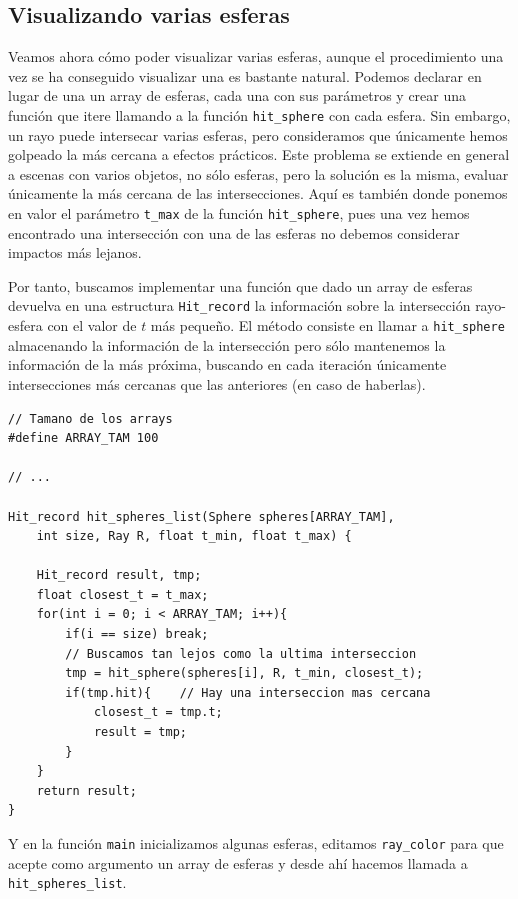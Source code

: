 \subsection{Visualizando varias esferas}

Veamos ahora cómo poder visualizar varias esferas, aunque el procedimiento una vez se ha conseguido visualizar una es bastante natural. Podemos declarar en lugar de una un array de esferas, cada una con sus parámetros y crear una función que itere llamando a la función \verb|hit_sphere| con cada esfera. Sin embargo, un rayo puede intersecar varias esferas, pero consideramos que únicamente hemos golpeado la más cercana a efectos prácticos. Este problema se extiende en general a escenas con varios objetos, no sólo esferas, pero la solución es la misma, evaluar únicamente la más cercana de las intersecciones. Aquí es también donde ponemos en valor el parámetro \verb|t_max| de la función \verb|hit_sphere|, pues una vez hemos encontrado una intersección con una de las esferas no debemos considerar impactos más lejanos.

Por tanto, buscamos implementar una función que dado un array de esferas devuelva en una estructura \verb|Hit_record| la información sobre la intersección rayo-esfera con el valor de $t$ más pequeño. El método consiste en llamar a \verb|hit_sphere| almacenando la información de la intersección pero sólo mantenemos la información de la más próxima, buscando en cada iteración únicamente intersecciones más cercanas que las anteriores (en caso de haberlas).
\begin{lstlisting}
// Tamano de los arrays
#define ARRAY_TAM 100

// ... 

Hit_record hit_spheres_list(Sphere spheres[ARRAY_TAM], 
    int size, Ray R, float t_min, float t_max) {

    Hit_record result, tmp;
    float closest_t = t_max;
    for(int i = 0; i < ARRAY_TAM; i++){
        if(i == size) break;
        // Buscamos tan lejos como la ultima interseccion
        tmp = hit_sphere(spheres[i], R, t_min, closest_t);
        if(tmp.hit){    // Hay una interseccion mas cercana
            closest_t = tmp.t;
            result = tmp;
        }
    }
    return result;
}
\end{lstlisting} 

Y en la función \verb|main| inicializamos algunas esferas, editamos \verb|ray_color| para que acepte como argumento un array de esferas y desde ahí hacemos llamada a \verb|hit_spheres_list|.

